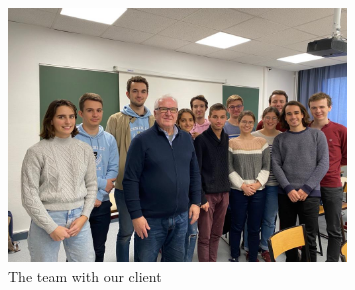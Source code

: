 \begin{figure}[ht]
    \centering
    \includegraphics[width=0.8\textwidth]{Images/Members.png}
    \caption{The team with our client}
    \label{fig:Members}
\end{figure}